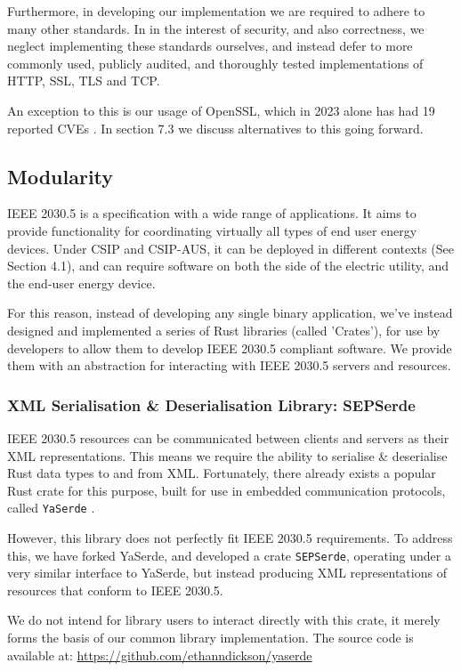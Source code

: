 Furthermore, in developing our implementation we are required to adhere to many other standards. In in the interest of security, and also correctness, we neglect implementing these standards ourselves, and instead defer to more commonly used, publicly audited, and thoroughly tested implementations of HTTP, SSL, TLS and TCP. 

An exception to this is our usage of OpenSSL, which in 2023 alone has had 19 reported CVEs \cite{OpensslCVE}. In section 7.3 we discuss alternatives to this going forward.

\subsection{Modularity}
IEEE 2030.5 is a specification with a wide range of applications. It aims to provide functionality for coordinating virtually all types of end user energy devices. Under CSIP and CSIP-AUS, it can be deployed in different contexts (See Section 4.1), and can require software on both the side of the electric utility, and the end-user energy device.

For this reason, instead of developing any single binary application, we've instead designed and implemented a series of Rust libraries (called 'Crates'), for use by developers to allow them to develop IEEE 2030.5 compliant software. We provide them with an abstraction for interacting with IEEE 2030.5 servers and resources.

\subsubsection{XML Serialisation \& Deserialisation Library: \- SEPSerde}
IEEE 2030.5 resources can be communicated between clients and servers as their XML representations. This means we require the ability to serialise \& deserialise Rust data types to and from XML.
Fortunately, there already exists a popular Rust crate for this purpose, built for use in embedded communication protocols, called \texttt{YaSerde} \cite[]{YaSerde}.

However, this library does not perfectly fit IEEE 2030.5 requirements. To address this, we have forked YaSerde, and developed a crate \texttt{SEPSerde}, operating under a very similar interface to YaSerde, but instead producing XML representations of resources that conform to IEEE 2030.5. 

We do not intend for library users to interact directly with this crate, it merely forms the basis of our common library implementation. 
The source code is available at: \url{https://github.com/ethanndickson/yaserde}

